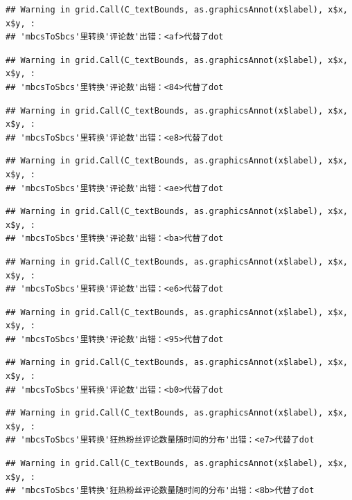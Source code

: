 \documentclass[
]{article}
\begin{document}
\begin{verbatim}
## Warning in grid.Call(C_textBounds, as.graphicsAnnot(x$label), x$x, x$y, :
## 'mbcsToSbcs'里转换'评论数'出错：<af>代替了dot
\end{verbatim}

\begin{verbatim}
## Warning in grid.Call(C_textBounds, as.graphicsAnnot(x$label), x$x, x$y, :
## 'mbcsToSbcs'里转换'评论数'出错：<84>代替了dot
\end{verbatim}

\begin{verbatim}
## Warning in grid.Call(C_textBounds, as.graphicsAnnot(x$label), x$x, x$y, :
## 'mbcsToSbcs'里转换'评论数'出错：<e8>代替了dot
\end{verbatim}

\begin{verbatim}
## Warning in grid.Call(C_textBounds, as.graphicsAnnot(x$label), x$x, x$y, :
## 'mbcsToSbcs'里转换'评论数'出错：<ae>代替了dot
\end{verbatim}

\begin{verbatim}
## Warning in grid.Call(C_textBounds, as.graphicsAnnot(x$label), x$x, x$y, :
## 'mbcsToSbcs'里转换'评论数'出错：<ba>代替了dot
\end{verbatim}

\begin{verbatim}
## Warning in grid.Call(C_textBounds, as.graphicsAnnot(x$label), x$x, x$y, :
## 'mbcsToSbcs'里转换'评论数'出错：<e6>代替了dot
\end{verbatim}

\begin{verbatim}
## Warning in grid.Call(C_textBounds, as.graphicsAnnot(x$label), x$x, x$y, :
## 'mbcsToSbcs'里转换'评论数'出错：<95>代替了dot
\end{verbatim}

\begin{verbatim}
## Warning in grid.Call(C_textBounds, as.graphicsAnnot(x$label), x$x, x$y, :
## 'mbcsToSbcs'里转换'评论数'出错：<b0>代替了dot
\end{verbatim}

\begin{verbatim}
## Warning in grid.Call(C_textBounds, as.graphicsAnnot(x$label), x$x, x$y, :
## 'mbcsToSbcs'里转换'狂热粉丝评论数量随时间的分布'出错：<e7>代替了dot
\end{verbatim}

\begin{verbatim}
## Warning in grid.Call(C_textBounds, as.graphicsAnnot(x$label), x$x, x$y, :
## 'mbcsToSbcs'里转换'狂热粉丝评论数量随时间的分布'出错：<8b>代替了dot
\end{verbatim}
\end{document}
